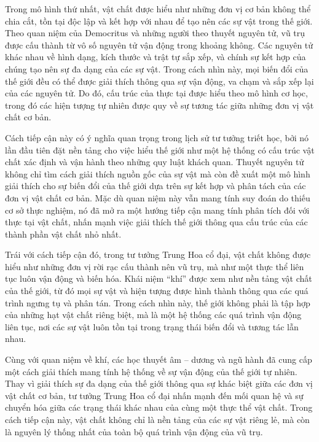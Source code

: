 \documentclass[14pt,a4paper]{extarticle}
\begin{document}
Trong mô hình thứ nhất, vật chất được hiểu như những đơn vị cơ bản không thể chia cắt, tồn tại độc lập và kết hợp với nhau để tạo nên các sự vật trong thế giới. Theo quan niệm của Democritus và những người theo thuyết nguyên tử, vũ trụ được cấu thành từ vô số nguyên tử vận động trong khoảng không. Các nguyên tử khác nhau về hình dạng, kích thước và trật tự sắp xếp, và chính sự kết hợp của chúng tạo nên sự đa dạng của các sự vật. Trong cách nhìn này, mọi biến đổi của thế giới đều có thể được giải thích thông qua sự vận động, va chạm và sắp xếp lại của các nguyên tử. Do đó, cấu trúc của thực tại được hiểu theo mô hình cơ học, trong đó các hiện tượng tự nhiên được quy về sự tương tác giữa những đơn vị vật chất cơ bản.

Cách tiếp cận này có ý nghĩa quan trọng trong lịch sử tư tưởng triết học, bởi nó lần đầu tiên đặt nền tảng cho việc hiểu thế giới như một hệ thống có cấu trúc vật chất xác định và vận hành theo những quy luật khách quan. Thuyết nguyên tử không chỉ tìm cách giải thích nguồn gốc của sự vật mà còn đề xuất một mô hình giải thích cho sự biến đổi của thế giới dựa trên sự kết hợp và phân tách của các đơn vị vật chất cơ bản. Mặc dù quan niệm này vẫn mang tính suy đoán do thiếu cơ sở thực nghiệm, nó đã mở ra một hướng tiếp cận mang tính phân tích đối với thực tại vật chất, nhấn mạnh việc giải thích thế giới thông qua cấu trúc của các thành phần vật chất nhỏ nhất.

Trái với cách tiếp cận đó, trong tư tưởng Trung Hoa cổ đại, vật chất không được hiểu như những đơn vị rời rạc cấu thành nên vũ trụ, mà như một thực thể liên tục luôn vận động và biến hóa. Khái niệm ``khí'' được xem như nền tảng vật chất của thế giới, từ đó mọi sự vật và hiện tượng được hình thành thông qua các quá trình ngưng tụ và phân tán. Trong cách nhìn này, thế giới không phải là tập hợp của những hạt vật chất riêng biệt, mà là một hệ thống các quá trình vận động liên tục, nơi các sự vật luôn tồn tại trong trạng thái biến đổi và tương tác lẫn nhau.

Cùng với quan niệm về khí, các học thuyết âm -- dương và ngũ hành đã cung cấp một cách giải thích mang tính hệ thống về sự vận động của thế giới tự nhiên. Thay vì giải thích sự đa dạng của thế giới thông qua sự khác biệt giữa các đơn vị vật chất cơ bản, tư tưởng Trung Hoa cổ đại nhấn mạnh đến mối quan hệ và sự chuyển hóa giữa các trạng thái khác nhau của cùng một thực thể vật chất. Trong cách tiếp cận này, vật chất không chỉ là nền tảng của các sự vật riêng lẻ, mà còn là nguyên lý thống nhất của toàn bộ quá trình vận động của vũ trụ.
\end{document}
